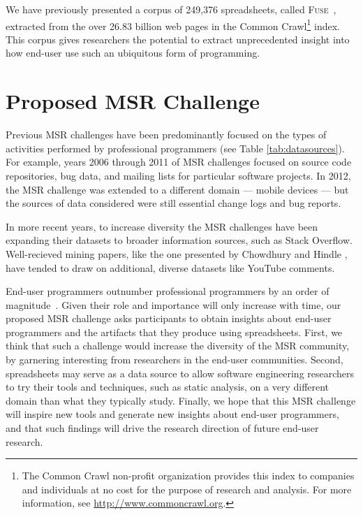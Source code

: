 \documentclass[conference]{IEEEtran}
\begin{document}
We have previously presented a corpus of 249,376 spreadsheets, called \textsc{Fuse}~\cite{barik2015}, extracted from the over 26.83 billion web pages in the Common Crawl\footnote{The Common Crawl non-profit organization provides this index to companies and individuals at no cost for the purpose of research and analysis. For more information, see \url{http://www.commoncrawl.org}.} index.
This corpus gives researchers the potential to extract unprecedented insight into how end-user use such an ubiquitous form of programming.


\section{Proposed MSR Challenge}
Previous MSR challenges have been predominantly focused on the types of activities performed by professional programmers (see Table \ref{tab:datasources}). 
For example, years 2006 through 2011 of MSR challenges focused on source code repositories, bug data, and mailing lists for particular software projects. 
In 2012, the MSR challenge was extended to a different domain --- mobile devices --- but the sources of data considered were still essential change logs and bug reports. 

In more recent years, to increase diversity the MSR challenges have been expanding their datasets to broader information sources, such as Stack Overflow.
Well-recieved mining papers, like the one presented by Chowdhury and Hindle \cite{chowdhury2015}, have tended to draw on additional, diverse datasets like YouTube comments.

End-user programmers outnumber professional programmers by an order of magnitude~\cite{Scaffidi2005}.
Given their role and importance will only increase with time, our proposed MSR challenge asks participants to obtain insights about end-user programmers and the artifacts that they produce using spreadsheets. 
%
First, we think that such a challenge would increase the diversity of the MSR community, by garnering interesting from researchers in the end-user communities. 
Second, spreadsheets may serve as a data source to allow software engineering researchers to try their tools and techniques, such as static analysis, on a very different domain than what they typically study. 
Finally, we hope that this MSR challenge will inspire new tools and generate new insights about end-user programmers, and that such findings will drive the research direction of future end-user research.
\end{document}
